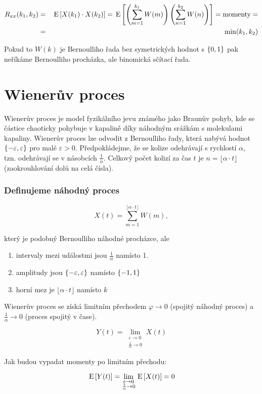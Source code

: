 \begin{eqnarray*}
R_{xx}(k_1,k_2) &=& \,\mathrm{E}\left[X(k_1)\cdot X(k_2)\right]=\,\mathrm{E}\left[\left(\sum_{m=1}^{k_1}W(m)\right)\left(\sum_{n=1}^{k_2}W(n)\right)\right]=\text{momenty}=\\
& = & \min(k_1,k_2)
\end{eqnarray*}

Pokud to $W(k)$ je Bernoulliho řada bez symetrických hodnot s $ \left\{0,1\right\} $ pak neříkáme Bernoulliho procházka, ale binomická sčítací řada.

\section{Wienerův proces}
Wienerův proces je model fyzikálního jevu známého jako Braunův pohyb, kde se částice chaoticky pohybuje v kapalině díky náhodným srážkám s molekulami kapaliny. Wienerův proces lze odvodit z Bernoulliho řady, která nabývá hodnot $\left\{-\varepsilon,\varepsilon\right\}$ pro malé $\varepsilon>0$. Předpokládejme, že se kolize odehrávají s rychlostí $\alpha$, tzn. odehrávají se v násobcích $\frac{1}{\alpha}$. Celkový počet kolizí za čas $t$ je $n=\lfloor\alpha\cdot t\rfloor$ (zaokrouhlování dolů na celá čísla).

\subsubsection*{Definujeme náhodný proces}
\[ X(t)=\sum_{m=1}^{\lfloor\alpha\cdot t\rfloor} W(m), \]

který je podobný Bernoulliho náhodné procházce, ale

\begin{enumerate}[label=\roman*)]
\item intervaly mezi událostmi jsou $\frac{1}{\alpha}$ namísto 1.
\item amplitudy jsou $\left\{-\varepsilon,\varepsilon\right\}$ namísto $\left\{-1,1\right\}$
\item horní mez je $\lfloor\alpha\cdot t\rfloor$ namísto $k$
\end{enumerate}

Wienerův proces se získá limitním přechodem $\varphi\to 0$ (spojitý náhodný proces) a $\frac{1}{\alpha}\to 0$ (proces spojitý v čase).

\[ Y(t) = \lim_{\substack{\varepsilon\to 0\\ \frac{1}{\alpha}\to 0}} X(t) \]

Jak budou vypadat momenty po limitním přechodu:

\[ \,\mathrm{E}\left[Y(t)\right] = \lim_{\substack{\varepsilon\to 0\\ \frac{1}{\alpha}\to 0}} \,\mathrm{E}\left[X(t)\right]=0 \]

